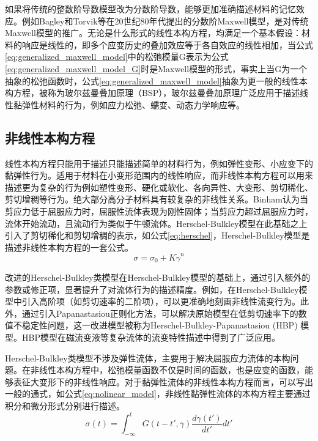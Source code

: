 如果将传统的整数阶导数模型改为分数阶导数，能够更加准确描述材料的记忆效应。例如Bagley和Torvik等在20世纪80年代提出的分数阶Maxwell模型，是对传统Maxwell模型的推广\cite{bagley1986fractional}。无论是什么形式的线性本构方程，均满足一个基本假设：材料的响应是线性的，即多个应变历史的叠加效应等于各自效应的线性相加，当公式\eqref{eq:generalized_maxwell_model}中的松弛模量G表示为公式\eqref{eq:generalized_maxwell_model_G}时是Maxwell模型的形式，事实上当G为一个抽象的松弛函数时，公式\eqref{eq:generalized_maxwell_model}抽象为更一般的线性本构方程，被称为玻尔兹曼叠加原理（BSP），玻尔兹曼叠加原理广泛应用于描述线性黏弹性材料的行为，例如应力松弛、蠕变、动态力学响应等\cite{boltzmannZurTheorieElastischen1878}。
\subsection{非线性本构方程}
线性本构方程只能用于描述只能描述简单的材料行为，例如弹性变形、小应变下的黏弹性行为\cite{fedorowiczElasticPerfectlyPlastic2024,lingComparisonReviewClassical2023,ricarteTutorialReviewLinear2024}。适用于材料在小变形范围内的线性响应，而非线性本构方程可以用来描述更为复杂的行为例如塑性变形、硬化或软化、各向异性、大变形、剪切稀化、剪切增稠等行为。绝大部分高分子材料具有较复杂的非线性关系。Binham认为当剪应力低于屈服应力时，屈服性流体表现为刚性固体；当剪应力超过屈服应力时，流体开始流动，且流动行为类似于牛顿流体\cite{binghaminvestigation}。Herschel-Bulkley模型在此基础之上引入了剪切稀化和剪切增稠的表示，如公式\eqref{eq:herschel}，Herschel-Bulkley模型是描述非线性本构方程的一套公式\cite{herschel1926konsistenzmessungen}。
\begin{equation}
  \sigma=\sigma_0+K\dot{\gamma}^n \label{eq:herschel}
\end{equation}

改进的Herschel-Bulkley类模型在Herschel-Bulkley模型的基础上，通过引入额外的参数或修正项，显著提升了对流体行为的描述精度。例如，在Herschel-Bulkley模型中引入高阶项（如剪切速率的二阶项），可以更准确地刻画非线性流变行为\cite{magnon2021precise}。此外，通过引入Papanastasiou正则化方法，可以解决原始模型在低剪切速率下的数值不稳定性问题，这一改进模型被称为Herschel-Bulkley-Papanastasiou (HBP) 模型。HBP模型在磁流变液等复杂流体的流变特性描述中得到了广泛应用\cite{papanastasiou1987flows}。

Herschel-Bulkley类模型不涉及弹性流体，主要用于解决屈服应力流体的本构问题。在非线性本构方程中，松弛模量函数不仅是时间的函数，也是应变的函数，能够表征大变形下的非线性响应。对于黏弹性流体的非线性本构方程而言，可以写出一般的通式，如公式\eqref{eq:nolinear_model}，非线性黏弹性流体的本构方程主要通过积分和微分形式分别进行描述\cite{ewoldtDesigningComplexFluids2022}。
\begin{equation}
  \sigma(t) = \int_{-\infty}^{t} G(t-t',\gamma) \frac{d\gamma(t')}{dt'} dt' \label{eq:nolinear_model}
\end{equation}

